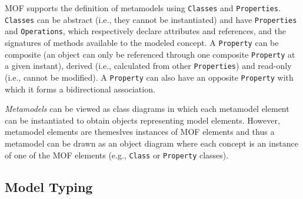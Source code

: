 MOF supports the definition of metamodels using \texttt{Classes} and \texttt{Properties}.\\ \texttt{Classes} can be abstract (i.e., they cannot be instantiated) and have \texttt{Properties} and \texttt{Operations}, which respectively declare attributes and references, and the signatures of methods available to the modeled concept. 
A \texttt{Property} can be composite (an object can only be referenced through one composite \texttt{Property} at a given instant), derived (i.e., calculated from other \texttt{Properties}) and read-only (i.e., cannot be modified). A \texttt{Property} can also have an opposite \texttt{Property} with which it forms a bidirectional association.


{\em Metamodels} can be viewed as class diagrams in which each metamodel element can be instantiated to obtain objects representing model elements. However, metamodel elements are themeslves instances of MOF elements and thus a metamodel can be drawn as an object diagram where each concept is an instance of one of the MOF elements (e.g., \texttt{Class} or \texttt{Property} classes).


\subsection{Model Typing}\label{modeltyping}

